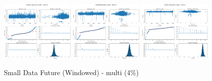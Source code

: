 \documentclass[11pt,english,a4paper,hidelinks]{book}
\begin{document}
\begin{figure}[H]
    \centering
    \includegraphics[width=0.32\textwidth]{images/code/models/linear_regression/third_model/Multi/quality_profit_1m_residuals.png}
    \includegraphics[width=0.32\textwidth]{images/code/models/linear_regression/third_model/Multi/quality_profit_1y_residuals.png}
    \includegraphics[width=0.32\textwidth]{images/code/models/linear_regression/third_model/Multi/quality_profit_5y_residuals.png}
    \caption{Small Data Future (Windowed) - \acrshort{multi} (4\%)}
    \label{fig:third_linear_regression_residuals}
\end{figure}
\end{document}
